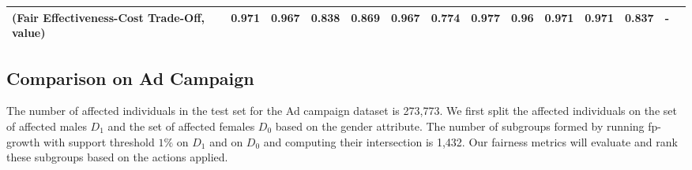 \documentclass{article}
\begin{document}
\begin{table}[ht]
{\begin{tabular}{lrrrrrrrrrrrrr}
(Fair Effectiveness-Cost Trade-Off, value) &                                     0.971 &                                     0.967 &                            0.838 &                            0.869 &               0.967 &                                    0.774 &                                    0.977 &                                      0.96 &                                     0.971 &                                     0.971 &                            0.837 &                                          - \\
\bottomrule
\end{tabular}

}
\end{table}

\subsection{Comparison on Ad Campaign}
The number of affected individuals in the test set for the Ad campaign dataset is 273,773. We first split the affected individuals on the set of affected males $D_{1}$ and the set of affected females $D_{0}$ based on the gender attribute. The number of subgroups formed by running fp-growth with support threshold $1\%$ on $D_{1}$ and on $D_{0}$ and computing their intersection is 1,432.  
Our fairness metrics will evaluate and rank these subgroups based on the actions applied.
\end{document}
